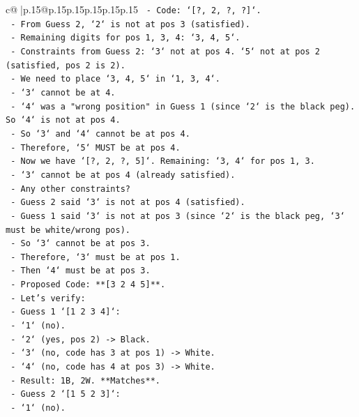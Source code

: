 \documentclass{article}
\begin{document}
{\begin{supertabular}{c@{$\;$}|p{.15\linewidth}@{}p{.15\linewidth}p{.15\linewidth}p{.15\linewidth}p{.15\linewidth}p{.15\linewidth}}
{{{\texttt{   {-} Code: `{[}?, 2, ?, ?{]}`.} \\
\texttt{   {-} From Guess 2, `2` is not at pos 3 (satisfied).} \\
\texttt{   {-} Remaining digits for pos 1, 3, 4: `3, 4, 5`.} \\
\texttt{   {-} Constraints from Guess 2: `3` not at pos 4. `5` not at pos 2 (satisfied, pos 2 is 2).} \\
\texttt{   {-} We need to place `3, 4, 5` in `1, 3, 4`.} \\
\texttt{   {-} `3` cannot be at 4.} \\
\texttt{   {-} `4` was a "wrong position" in Guess 1 (since `2` is the black peg). So `4` is not at pos 4.} \\
\texttt{   {-} So `3` and `4` cannot be at pos 4.} \\
\texttt{   {-} Therefore, `5` MUST be at pos 4.} \\
\texttt{   {-} Now we have `{[}?, 2, ?, 5{]}`. Remaining: `3, 4` for pos 1, 3.} \\
\texttt{   {-} `3` cannot be at pos 4 (already satisfied).} \\
\texttt{   {-} Any other constraints?} \\
\texttt{   {-} Guess 2 said `3` is not at pos 4 (satisfied).} \\
\texttt{   {-} Guess 1 said `3` is not at pos 3 (since `2` is the black peg, `3` must be white/wrong pos).} \\
\texttt{   {-} So `3` cannot be at pos 3.} \\
\texttt{   {-} Therefore, `3` must be at pos 1.} \\
\texttt{   {-} Then `4` must be at pos 3.} \\
\texttt{   {-} Proposed Code: **{[}3 2 4 5{]}**.} \\
\texttt{   {-} Let's verify:} \\
\texttt{     {-} Guess 1 `{[}1 2 3 4{]}`:} \\
\texttt{       {-} `1` (no).} \\
\texttt{       {-} `2` (yes, pos 2) {-}> Black.} \\
\texttt{       {-} `3` (no, code has 3 at pos 1) {-}> White.} \\
\texttt{       {-} `4` (no, code has 4 at pos 3) {-}> White.} \\
\texttt{       {-} Result: 1B, 2W. **Matches**.} \\
\texttt{     {-} Guess 2 `{[}1 5 2 3{]}`:} \\
\texttt{       {-} `1` (no).} \\
}}}
\end{supertabular}}
\end{document}
